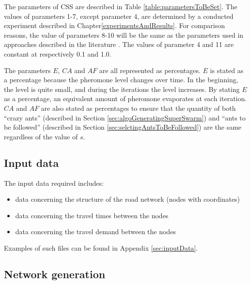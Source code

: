 The parameters of CSS are described in Table \vref{table:parametersToBeSet}. The values of parameters 1-7, except parameter 4, are determined by a conducted experiment described in Chapter\vref{experimentsAndResults}. For comparison reasons, the value of parameters 8-10 will be the same as the parameters used in approaches described in the literature \citep{mandl79, kechagiopoulos14, nikolic14,kidwai98,fan10,chakroborty02,zhang10,chew12,baaj91, mumford13}. The values of parameter 4 and 11 are constant at respectively 0.1 and 1.0.

The parameters $E$, $CA$ and $AF$ are all represented as percentages. $E$ is stated as a percentage because the pheromone level changes over time. In the beginning, the level is quite small, and during the iterations the level increases. By stating $E$ as a percentage, an equivalent amount of pheromone evaporates at each iteration. $CA$ and $AF$ are also stated as percentages to ensure that the quantity of both ``crazy ants'' (described in Section \vref{sec:algoGeneratingSuperSwarm}) and ``ants to be followed'' (described in Section \vref{sec:selctingAntsToBeFollowed}) are the same regardless of the value of $s$. 

\subsection{Input data}
The input data required includes:
\begin{itemize}
\item data concerning the structure of the road network (nodes with coordinates)
\item data concerning the travel times between the nodes
\item data concerning the travel demand between the nodes
\end{itemize}
Examples of such files can be found in Appendix \vref{sec:inputData}.

\subsection{Network generation}
\label{subsec:networkGeneration}

